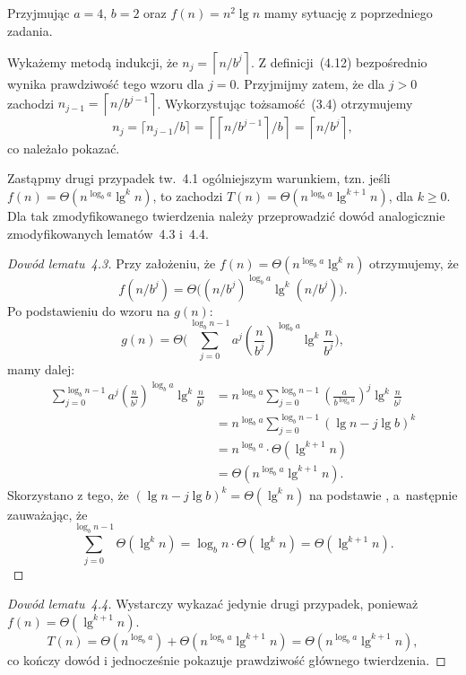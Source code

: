 \exercise{} %
Przyjmując $a=4$, $b=2$ oraz $f(n)=n^2\lg n$ mamy sytuację z poprzedniego zadania.


\exercise{} %
Wykażemy metodą indukcji, że $n_j=\left\lceil n/b^j\right\rceil$. Z definicji~(4.12) bezpośrednio wynika prawdziwość tego wzoru dla $j=0$. Przyjmijmy zatem, że dla $j>0$ zachodzi $n_{j-1}=\left\lceil n/b^{j-1}\right\rceil$. Wykorzystując tożsamość~(3.4) otrzymujemy
\[
	n_j = \lceil n_{j-1}/b\rceil = \left\lceil\left\lceil n/b^{j-1}\right\rceil\!/b\right\rceil = \left\lceil n/b^j\right\rceil,
\]
co należało pokazać.

\exercise{} %
Zastąpmy drugi przypadek tw.~4.1 ogólniejszym warunkiem, tzn. jeśli $f(n)=\Theta(n^{\log_ba}\lg^kn)$, to zachodzi $T(n)=\Theta(n^{\log_ba}\lg^{k+1}n)$, dla $k\ge0$. Dla tak zmodyfikowanego twierdzenia należy przeprowadzić dowód analogicznie zmodyfikowanych lematów~4.3 i~4.4.

\begin{proof}[Dowód lematu~4.3]
	Przy założeniu, że $f(n)=\Theta(n^{\log_ba}\lg^kn)$ otrzymujemy, że
	\[
		f(n/b^j)=\Theta\bigl((n/b^j)^{\log_ba}\lg^k(n/b^j)\bigr).
	\]
	Po podstawieniu do wzoru na $g(n)$:
	\[
		g(n) = \Theta\biggl(\sum_{j=0}^{\log_bn-1}a^j\left(\frac{n}{b^j}\right)^{\log_ba}\lg^k\frac{n}{b^j}\biggr),
	\]
	mamy dalej:
	\begin{align*}
		\sum_{j=0}^{\log_bn-1}a^j\left(\frac{n}{b^j}\right)^{\log_ba}\lg^k\frac{n}{b^j} &= n^{\log_ba}\sum_{j=0}^{\log_bn-1}\left(\frac{a}{b^{\log_ba}}\right)^j\lg^k\frac{n}{b^j} \\
		&= n^{\log_ba}\sum_{j=0}^{\log_bn-1}(\lg n-j\lg b)^k \\
		&= n^{\log_ba}\cdot\Theta(\lg^{k+1}n) \\
		&= \Theta(n^{\log_ba}\lg^{k+1}n).
	\end{align*}
	Skorzystano z tego, że $(\lg n-j\lg b)^k=\Theta(\lg^kn)$ na podstawie , a~następnie zauważając, że
	\[
		\sum_{j=0}^{\log_bn-1}\Theta(\lg^kn) = \log_bn\cdot\Theta(\lg^kn) = \Theta(\lg^{k+1}n).
	\]
\end{proof}

\begin{proof}[Dowód lematu~4.4]
	Wystarczy wykazać jedynie drugi przypadek, ponieważ $f(n)=\Theta(\lg^{k+1}n)$.
	\[
		T(n) = \Theta(n^{\log_ba})+\Theta(n^{\log_ba}\lg^{k+1}n) = \Theta(n^{\log_ba}\lg^{k+1}n),
	\]
	co kończy dowód i jednocześnie pokazuje prawdziwość głównego twierdzenia.
\end{proof}

